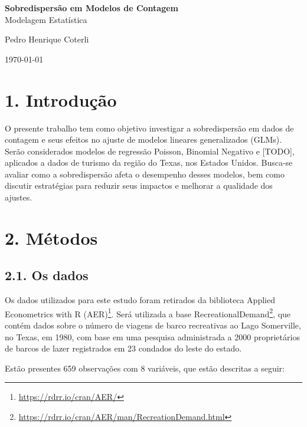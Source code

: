\documentclass[
]{article}
\author{}
\date{\vspace{-2.5em}}
\begin{document}
\begin{titlepage}
\centering
{\LARGE \textbf{Sobredispersão em Modelos de Contagem}\\[1em]
Modelagem Estatística \par}
\vspace{2cm}
{\large Pedro Henrique Coterli \par}
\vfill
{\large \today \par}
\end{titlepage}

\section{1. Introdução}\label{introduuxe7uxe3o}

O presente trabalho tem como objetivo investigar a sobredispersão em
dados de contagem e seus efeitos no ajuste de modelos lineares
generalizados (GLMs). Serão considerados modelos de regressão Poisson,
Binomial Negativo e {[}TODO{]}, aplicados a dados de turismo da região
do Texas, nos Estados Unidos. Busca-se avaliar como a sobredispersão
afeta o desempenho desses modelos, bem como discutir estratégias para
reduzir seus impactos e melhorar a qualidade dos ajustes.

\section{2. Métodos}\label{muxe9todos}

\subsection{2.1. Os dados}\label{os-dados}

Os dados utilizados para este estudo foram retirados da biblioteca
Applied Econometrics with R (AER)\footnote{\url{https://rdrr.io/cran/AER/}}.
Será utilizada a base RecreationalDemand\footnote{\url{https://rdrr.io/cran/AER/man/RecreationDemand.html}},
que contém dados sobre o número de viagens de barco recreativas ao Lago
Somerville, no Texas, em 1980, com base em uma pesquisa administrada a
2000 proprietários de barcos de lazer registrados em 23 condados do
leste do estado.

Estão presentes 659 observações com 8 variáveis, que estão descritas a
seguir:
\end{document}
